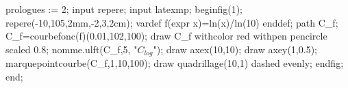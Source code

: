 prologues := 2;
input repere;
input latexmp;
beginfig(1);
repere(-10,105,2mm,-2,3,2cm);
vardef f(expr x)=ln(x)/ln(10) enddef;
path C_f; 
C_f=courbefonc(f)(0.01,102,100);
draw C_f withcolor red withpen pencircle scaled 0.8;
nomme.ulft(C_f,5, "$C_{log}$");
draw axex(10,10);
draw axey(1,0.5);
marquepointcourbe(C_f,1,10,100);
draw quadrillage(10,1) dashed evenly;
endfig;
end;
